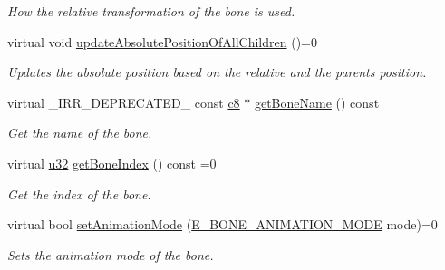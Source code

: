 \begin{DoxyCompactItemize}
\begin{DoxyCompactList}\small\item\em How the relative transformation of the bone is used. \end{DoxyCompactList}\item 
\mbox{\label{classirr_1_1scene_1_1IBoneSceneNode_ab405c67e87dd79b7c1b9c16a6b8c3182}} 
virtual void \hyperlink{classirr_1_1scene_1_1IBoneSceneNode_ab405c67e87dd79b7c1b9c16a6b8c3182}{update\+Absolute\+Position\+Of\+All\+Children} ()=0
\begin{DoxyCompactList}\small\item\em Updates the absolute position based on the relative and the parents position. \end{DoxyCompactList}\item 
virtual \+\_\+\+I\+R\+R\+\_\+\+D\+E\+P\+R\+E\+C\+A\+T\+E\+D\+\_\+ const \hyperlink{namespaceirr_a9395eaea339bcb546b319e9c96bf7410}{c8} $\ast$ \hyperlink{classirr_1_1scene_1_1IBoneSceneNode_a1c40bee44b89fe81178782e999cbe3a8}{get\+Bone\+Name} () const
\begin{DoxyCompactList}\small\item\em Get the name of the bone. \end{DoxyCompactList}\item 
\mbox{\label{classirr_1_1scene_1_1IBoneSceneNode_ac372b2c84a3427df1fdc78deae7d00ea}} 
virtual \hyperlink{namespaceirr_a0416a53257075833e7002efd0a18e804}{u32} \hyperlink{classirr_1_1scene_1_1IBoneSceneNode_ac372b2c84a3427df1fdc78deae7d00ea}{get\+Bone\+Index} () const =0
\begin{DoxyCompactList}\small\item\em Get the index of the bone. \end{DoxyCompactList}\item 
virtual bool \hyperlink{classirr_1_1scene_1_1IBoneSceneNode_a424a467f045e809bcad2aa239edb9994}{set\+Animation\+Mode} (\hyperlink{namespaceirr_1_1scene_a318162c0a3aad1cf228ed7daddd44801}{E\+\_\+\+B\+O\+N\+E\+\_\+\+A\+N\+I\+M\+A\+T\+I\+O\+N\+\_\+\+M\+O\+DE} mode)=0
\begin{DoxyCompactList}\small\item\em Sets the animation mode of the bone. \end{DoxyCompactList}\item 
\mbox{\label{classirr_1_1scene_1_1IBoneSceneNode_a332e040471057cf6a1a0ae8dfa2c0f5f}} 

\end{DoxyCompactItemize}
